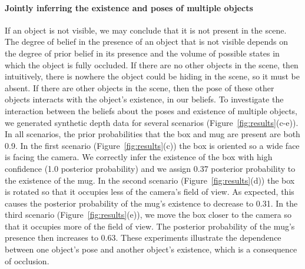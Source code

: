\paragraph{Jointly inferring the existence and poses of multiple objects}
If an object is not visible, we may conclude that it is not present in the scene.
The degree of belief in the presence of an object that is not visible depends on the degree of prior belief in its presence and the volume of possible states in which the object is fully occluded.
If there are no other objects in the scene, then intuitively, there is nowhere the object could be hiding in the scene, so it must be absent.
If there are other objects in the scene, then the pose of these other objects interacts with the object's existence, in our beliefs.
To investigate the interaction between the beliefs about the poses and existence of multiple objects, we generated synthetic depth data for several scenarios (Figure~\ref{fig:results}(c-e)).
In all scenarios, the prior probabilities that the box and mug are present are both 0.9.
In the first scenario (Figure~\ref{fig:results}(c)) the box is oriented so a wide face is facing the camera.
We correctly infer the existence of the box with high confidence (1.0 posterior probability) and we assign 0.37 posterior probability to the existence of the mug.
In the second scenario (Figure~\ref{fig:results}(d)) the box is rotated so that it occupies less of the camera's field of view.
As expected, this causes the posterior probability of the mug's existence to decrease to 0.31.
In the third scenario (Figure~\ref{fig:results}(e)), we move the box closer to the camera so that it occupies more of the field of view.
The posterior probability of the mug's presence then increases to 0.63.
These experiments illustrate the dependence between one object's pose and another object's existence, which is a consequence of occlusion.
